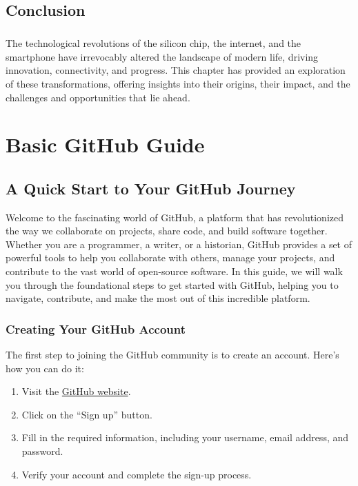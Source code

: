 \documentclass[a4paper,12pt]{book}
\begin{document}
\section*{Conclusion}
\paragraph{}
The technological revolutions of the silicon chip, the internet, and the smartphone have irrevocably altered the landscape of modern life, driving innovation, connectivity, and progress. This chapter has provided an exploration of these transformations, offering insights into their origins, their impact, and the challenges and opportunities that lie ahead.



\clearpage
{}
\appendix
\renewcommand{\thechapter}{\Roman{chapter}} %

\chapter{Basic GitHub Guide}
\section*{A Quick Start to Your GitHub Journey}

Welcome to the fascinating world of GitHub, a platform that has revolutionized the way we collaborate on projects, share code, and build software together. Whether you are a programmer, a writer, or a historian, GitHub provides a set of powerful tools to help you collaborate with others, manage your projects, and contribute to the vast world of open-source software. In this guide, we will walk you through the foundational steps to get started with GitHub, helping you to navigate, contribute, and make the most out of this incredible platform.

\subsection*{Creating Your GitHub Account}

The first step to joining the GitHub community is to create an account. Here’s how you can do it:

\begin{enumerate}
    \item Visit the \href{https://github.com/}{GitHub website}.
    \item Click on the “Sign up” button.
    \item Fill in the required information, including your username, email address, and password.
    \item Verify your account and complete the sign-up process.
\end{enumerate}
\end{document}
